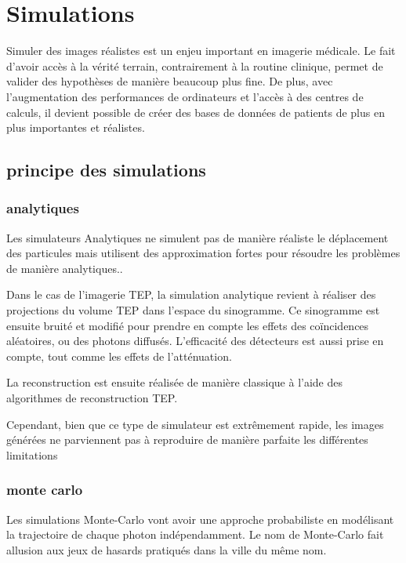\chapter{Simulations}

Simuler des images réalistes est un enjeu important en imagerie médicale. Le fait d'avoir accès à la vérité terrain, contrairement à la routine clinique, permet de valider des hypothèses de manière beaucoup plus fine. De plus, avec l'augmentation des performances de ordinateurs et l'accès à des centres de calculs, il devient possible de créer des bases de données de patients de plus en plus importantes et réalistes.

	\section{principe des simulations}

		\subsection{analytiques}

Les simulateurs Analytiques ne simulent pas de manière réaliste le déplacement des particules mais  utilisent des approximation fortes pour résoudre les problèmes de manière analytiques..

Dans le cas de l'imagerie TEP, la simulation analytique revient à réaliser des projections du volume TEP dans l'espace du sinogramme. Ce sinogramme est ensuite bruité et modifié pour prendre en compte les effets des coïncidences aléatoires, ou des photons diffusés. L'efficacité des détecteurs est aussi prise en compte, tout comme les effets de l'atténuation. 

La reconstruction est ensuite réalisée de manière classique à l'aide des algorithmes de reconstruction TEP.


Cependant, bien que ce type de simulateur est extrêmement rapide, les images générées ne parviennent pas à reproduire de manière parfaite les différentes limitations 

		\subsection{monte carlo}

Les simulations Monte-Carlo vont avoir une approche probabiliste en modélisant la trajectoire de chaque photon indépendamment. Le nom de Monte-Carlo fait allusion aux jeux de hasards pratiqués dans la ville du même nom.

